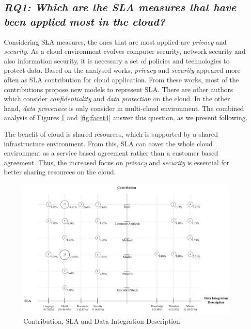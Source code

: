 \subsection{\textit{RQ1: Which are the SLA measures that have been applied most in
the cloud?}}

Considering SLA measures, the ones that are most applied are \textit{privacy}
and \textit{security}. As a cloud environment evolves computer
security, network security and also information security, it is necessary
a set of policies and technologies to protect data. Based on the analysed works,
\textit{privacy} and \textit{security} appeared more often as SLA contribution
for cloud application. From these works, most of the contributions propose new
models to represent SLA. There are other authors which consider
\textit{confidentiality} and \textit{data protection} on the cloud. In the other
hand, \textit{data provenace} is only consider in multi-cloud environment.
The combined analysis of Figures \ref{fig:facet1} and \ref{fig:facet4} answer
this question, as we present following.

The benefit of cloud is shared resources, which is supported by a shared
infrastructure environment. From this, SLA can cover the whole cloud environment
as a service based agreement rather than a customer based agreement. Thus, the
increased focus on \textit{privacy} and \textit{security} is essential for
better sharing resources on the cloud.


\begin{figure}[h!]
\centering
\includegraphics[scale=0.56]{figs/bubble-charts/Contribution-SLA-DIdescription.pdf} 
\caption{Contribution, SLA and Data Integration Description}\label{fig:facet1}
\end{figure}

